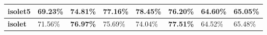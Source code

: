 \documentclass[a4paper,fleqn]{cas-sc}
\begin{document}
\begin{table}[hbt!]
\begin{tabular}{|l|p{}|llllll|}
\textbf{isolet5}                                                            & 69.23\%                          & \multicolumn{1}{l|}{74.81\%}           & \multicolumn{1}{l|}{\textbf{77.16\%}}                                                               & \multicolumn{1}{l|}{\textbf{78.45\%}}  & \multicolumn{1}{l|}{76.20\%}                                                                         & \multicolumn{1}{l|}{64.60\%}            & 65.05\%                                                                                              \\ \hline
\textbf{isolet}                                                             & 71.56\%                          & \multicolumn{1}{l|}{\textbf{76.97\%}}  & \multicolumn{1}{l|}{75.69\%}                                                                        & \multicolumn{1}{l|}{74.04\%}           & \multicolumn{1}{l|}{\textbf{77.51\%}}                                                                & \multicolumn{1}{l|}{64.52\%}                & 65.48\%                                                                                              \\ \hline
\end{tabular}
\end{table}
\end{document}
